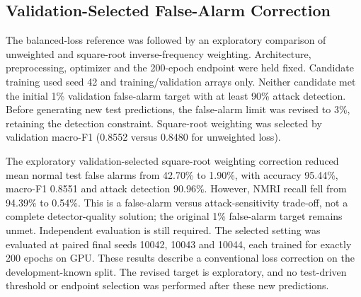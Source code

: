 \subsection{Validation-Selected False-Alarm Correction}
The balanced-loss reference was followed by an exploratory comparison of unweighted and square-root inverse-frequency weighting. Architecture, preprocessing, optimizer and the 200-epoch endpoint were held fixed. Candidate training used seed 42 and training/validation arrays only. Neither candidate met the initial 1\% validation false-alarm target with at least 90\% attack detection. Before generating new test predictions, the false-alarm limit was revised to 3\%, retaining the detection constraint. Square-root weighting was selected by validation macro-F1 (0.8552 versus 0.8480 for unweighted loss).

The exploratory validation-selected square-root weighting correction reduced mean normal test false alarms from 42.70\% to 1.90\%, with accuracy 95.44\%, macro-F1 0.8551 and attack detection 90.96\%. However, NMRI recall fell from 94.39\% to 0.54\%. This is a false-alarm versus attack-sensitivity trade-off, not a complete detector-quality solution; the original 1\% false-alarm target remains unmet. Independent evaluation is still required.
The selected setting was evaluated at paired final seeds 10042, 10043 and 10044, each trained for exactly 200 epochs on GPU. These results describe a conventional loss correction on the development-known split. The revised target is exploratory, and no test-driven threshold or endpoint selection was performed after these new predictions.
